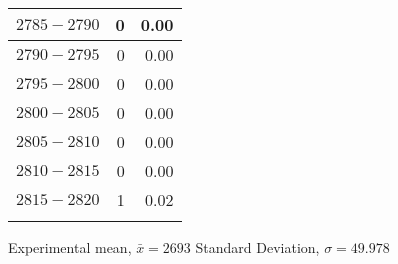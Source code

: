 \begin{longtable}{|l|r|r|}
		{\color[HTML]{000000} $ 2785 - 2790 $} & {\color[HTML]{000000} 0}                                                      & {\color[HTML]{000000} 0.00}                                                     \\ \hline
		{\color[HTML]{000000} $ 2790 - 2795 $} & {\color[HTML]{000000} 0}                                                      & {\color[HTML]{000000} 0.00}                                                     \\ \hline
		{\color[HTML]{000000} $ 2795 - 2800 $} & {\color[HTML]{000000} 0}                                                      & {\color[HTML]{000000} 0.00}                                                     \\ \hline
		{\color[HTML]{000000} $ 2800 - 2805 $} & {\color[HTML]{000000} 0}                                                      & {\color[HTML]{000000} 0.00}                                                     \\ \hline
		{\color[HTML]{000000} $ 2805 - 2810 $} & {\color[HTML]{000000} 0}                                                      & {\color[HTML]{000000} 0.00}                                                     \\ \hline
		{\color[HTML]{000000} $ 2810 - 2815 $} & {\color[HTML]{000000} 0}                                                      & {\color[HTML]{000000} 0.00}                                                     \\ \hline
		{\color[HTML]{000000} $ 2815 - 2820 $} & {\color[HTML]{000000} 1}                                                      & {\color[HTML]{000000} 0.02}                                                     \\ \hline
		\caption{}
		\label{tab:Frequency}\\
	\end{longtable}
	
	Experimental mean, $\bar{x}=2693 $
	Standard Deviation, $\sigma=49.978 $
	
